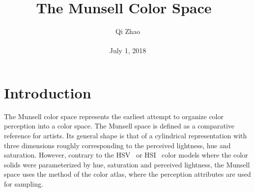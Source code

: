 \documentclass[10pt,twocolumn,letterpaper]{article}
\begin{document}
\title{The Munsell Color Space~\cite{Nickerson1940History}}
\author{Qi Zhao\\\\July 1, 2018}

\maketitle
\section{Introduction}
The Munsell color space represents the earliest attempt to organize color perception into a color space. The Munsell space is defined as a comparative reference for artists. Its general shape is that of a cylindrical representation with three dimensions roughly corresponding to the perceived lightness, hue and saturation. However, contrary to the HSV~\cite{Cucchiara2002Improving} or HSI~\cite{Sun2006HSI} color models where the color solids were parameterized by hue, saturation and perceived lightness, the Munsell space uses the method of the color atlas, where the perception attributes are used for sampling.
\end{document}
